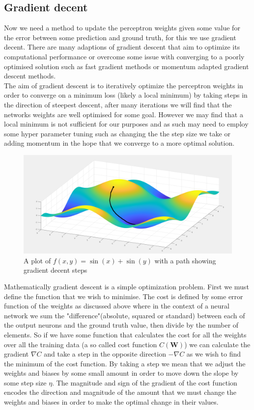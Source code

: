 \documentclass{article}
\begin{document}
\subsection{Gradient decent}
\label{sec:gradientDecent}
Now we need a method to update the perceptron weights given some value for the error between some prediction and ground truth, for this we use gradient decent. There are many adaptions of gradient descent that aim to optimize its computational performance or overcome some issue with converging to a poorly optimised solution such as fast gradient methods or momentum adapted gradient descent methods. \\
The aim of gradient descent is to iteratively optimize the perceptron weights in order to converge on a minimum loss (likely a local minimum) by taking steps in the direction of steepest descent, after many iterations we will find that the networks weights are well optimised for some goal. However we may find that a local minimum is not sufficient for our purposes and as such may need to employ some hyper parameter tuning such as changing the the step size we take or adding momentum in the hope that we converge to a more optimal solution.
\begin{figure}[H]
\centering
\caption{A plot of $f(x,y) = \sin(x) + \sin(y)$ with a path showing gradient decent steps}
\includegraphics[scale=0.2]{mesh.png}
\end{figure}
Mathematically gradient descent is a simple optimization problem. First we must define the function that we wish to minimise. The cost is defined by some error function of the weights as discussed above where in the context of a neural network we sum the "difference"(absolute, squared or standard) between each of the output neurons and the ground truth value, then divide by the number of elements. So if we have some function that calculates the cost for all the weights over all the training data (a so called cost function $C(\mathbf{W})$) we can calculate the gradient $\nabla C$ and take a step in the opposite direction $-\nabla C$ as we wish to find the minimum of the cost function. By taking a step we mean that we adjust the weights and biases by some small amount in order to move down the slope by some step size $\eta$. The magnitude and sign of the gradient of the cost function encodes the direction and magnitude of the amount that we must change the weights and biases in order to make the optimal change in their values. 
\end{document}

